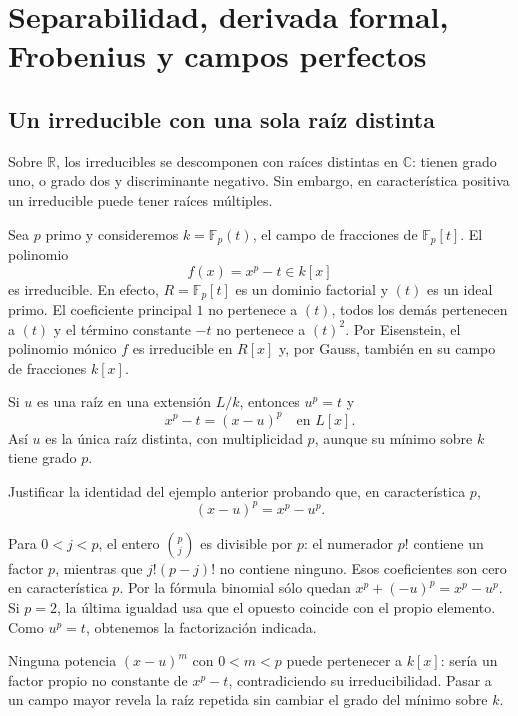 \section{Separabilidad, derivada formal, Frobenius y campos perfectos}\label{sec:campos-separabilidad}

\subsection{Un irreducible con una sola raíz distinta}\label{tema:25-2-1}
Sobre $\mathbb R$, los irreducibles se descomponen con raíces distintas en $\mathbb C$: tienen grado uno, o grado dos y discriminante negativo. Sin embargo, en característica positiva un irreducible puede tener raíces múltiples.

\begin{ejem}\label{ejem:C25-inseparable}
Sea $p$ primo y consideremos $k=\mathbb F_p(t)$, el campo de fracciones de $\mathbb F_p[t]$. El polinomio
\[
f(x)=x^p-t\in k[x]
\]
es irreducible. En efecto, $R=\mathbb F_p[t]$ es un dominio factorial y $(t)$ es un ideal primo. El coeficiente principal $1$ no pertenece a $(t)$, todos los demás pertenecen a $(t)$ y el término constante $-t$ no pertenece a $(t)^2$. Por Eisenstein, el polinomio mónico $f$ es irreducible en $R[x]$ y, por Gauss, también en su campo de fracciones $k[x]$.

Si $u$ es una raíz en una extensión $L/k$, entonces $u^p=t$ y
\[
x^p-t=(x-u)^p\quad\text{en }L[x].
\]
Así $u$ es la única raíz distinta, con multiplicidad $p$, aunque su mínimo sobre $k$ tiene grado $p$.
\end{ejem}

\begin{ejer}\label{ejer:C25-binomial}
Justificar la identidad del ejemplo anterior probando que, en característica $p$,
\[
(x-u)^p=x^p-u^p.
\]
\end{ejer}
\begin{sol}
Para $0<j<p$, el entero $\binom pj$ es divisible por $p$: el numerador $p!$ contiene un factor $p$, mientras que $j!(p-j)!$ no contiene ninguno. Esos coeficientes son cero en característica $p$. Por la fórmula binomial sólo quedan $x^p+(-u)^p=x^p-u^p$. Si $p=2$, la última igualdad usa que el opuesto coincide con el propio elemento. Como $u^p=t$, obtenemos la factorización indicada.
\end{sol}
Ninguna potencia $(x-u)^m$ con $0<m<p$ puede pertenecer a $k[x]$: sería un factor propio no constante de $x^p-t$, contradiciendo su irreducibilidad. Pasar a un campo mayor revela la raíz repetida sin cambiar el grado del mínimo sobre $k$.

